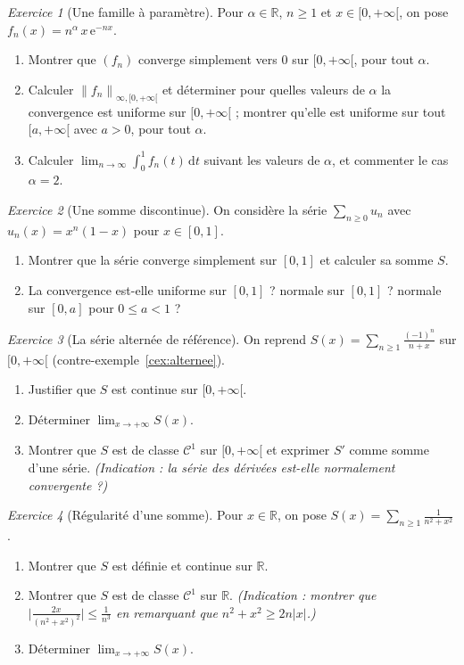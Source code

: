 \documentclass[11pt,a4paper]{article}
\theoremstyle{plain}
\theoremstyle{definition}
\theoremstyle{remark}
\newtheorem{exercice}{Exercice}
\newcommand{\R}{\mathbb{R}}
\newcommand{\Ninf}[2]{\left\lVert #1 \right\rVert_{\infty,#2}}
\newcommand{\dd}{\,\mathrm{d}}
\numberwithin{equation}{section}
\begin{document}
\begin{exercice}[Une famille à paramètre]
Pour $\alpha\in\R$, $n\geq 1$ et $x\in[0,+\infty[$, on pose
$f_n(x) = n^{\alpha}\,x\,\mathrm{e}^{-nx}$.
\begin{enumerate}
    \item Montrer que $(f_n)$ converge simplement vers $0$ sur
    $[0,+\infty[$, pour tout $\alpha$.
    \item Calculer $\Ninf{f_n}{[0,+\infty[}$ et déterminer pour quelles
    valeurs de $\alpha$ la convergence est uniforme sur $[0,+\infty[$ ;
    montrer qu'elle est uniforme sur tout $[a,+\infty[$ avec $a>0$, pour
    tout $\alpha$.
    \item Calculer $\lim_{n\to\infty}\int_0^1 f_n(t)\dd t$ suivant les
    valeurs de $\alpha$, et commenter le cas $\alpha=2$.
\end{enumerate}
\end{exercice}

\begin{exercice}[Une somme discontinue]
On considère la série $\sum_{n\geq 0} u_n$ avec $u_n(x)=x^n(1-x)$ pour
$x\in[0,1]$.
\begin{enumerate}
    \item Montrer que la série converge simplement sur $[0,1]$ et calculer
    sa somme $S$.
    \item La convergence est-elle uniforme sur $[0,1]$ ? normale sur
    $[0,1]$ ? normale sur $[0,a]$ pour $0\leq a<1$ ?
\end{enumerate}
\end{exercice}

\begin{exercice}[La série alternée de référence]
On reprend $\displaystyle S(x)=\sum_{n\geq 1}\frac{(-1)^n}{n+x}$ sur
$[0,+\infty[$ (contre-exemple~\ref{cex:alternee}).
\begin{enumerate}
    \item Justifier que $S$ est continue sur $[0,+\infty[$.
    \item Déterminer $\lim_{x\to+\infty}S(x)$.
    \item Montrer que $S$ est de classe $\mathcal{C}^1$ sur
    $[0,+\infty[$ et exprimer $S'$ comme somme d'une série.
    \emph{(Indication : la série des dérivées est-elle normalement
    convergente ?)}
\end{enumerate}
\end{exercice}

\begin{exercice}[Régularité d'une somme]
Pour $x\in\R$, on pose $\displaystyle S(x)=\sum_{n\geq 1}
\frac{1}{n^2+x^2}$.
\begin{enumerate}
    \item Montrer que $S$ est définie et continue sur $\R$.
    \item Montrer que $S$ est de classe $\mathcal{C}^1$ sur $\R$.
    \emph{(Indication : montrer que
    $\bigl\lvert \frac{2x}{(n^2+x^2)^2} \bigr\rvert \leq \frac{1}{n^3}$
    en remarquant que $n^2+x^2\geq 2n\lvert x\rvert$.)}
    \item Déterminer $\lim_{x\to+\infty}S(x)$.
\end{enumerate}
\end{exercice}
\end{document}
